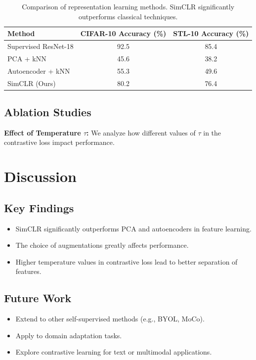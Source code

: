 \documentclass[11pt]{article}
\begin{document}
\begin{table}[h]
\centering
\begin{tabular}{lcc}
\toprule
Method & CIFAR-10 Accuracy (\%) & STL-10 Accuracy (\%) \\
\midrule
Supervised ResNet-18 & 92.5 & 85.4 \\
PCA + kNN & 45.6 & 38.2 \\
Autoencoder + kNN & 55.3 & 49.6 \\
SimCLR (Ours) & 80.2 & 76.4 \\
\bottomrule
\end{tabular}
\caption{Comparison of representation learning methods. SimCLR significantly outperforms classical techniques.}
\end{table}

\subsection{Ablation Studies}
\textbf{Effect of Temperature $\tau$:} We analyze how different values of $\tau$ in the contrastive loss impact performance.

\section{Discussion}

\subsection{Key Findings}
\begin{itemize}
  \item SimCLR significantly outperforms PCA and autoencoders in feature learning.
  \item The choice of augmentations greatly affects performance.
  \item Higher temperature values in contrastive loss lead to better separation of features.
\end{itemize}

\subsection{Future Work}
\begin{itemize}
  \item Extend to other self-supervised methods (e.g., BYOL, MoCo).
  \item Apply to domain adaptation tasks.
  \item Explore contrastive learning for text or multimodal applications.
\end{itemize}
\end{document}
